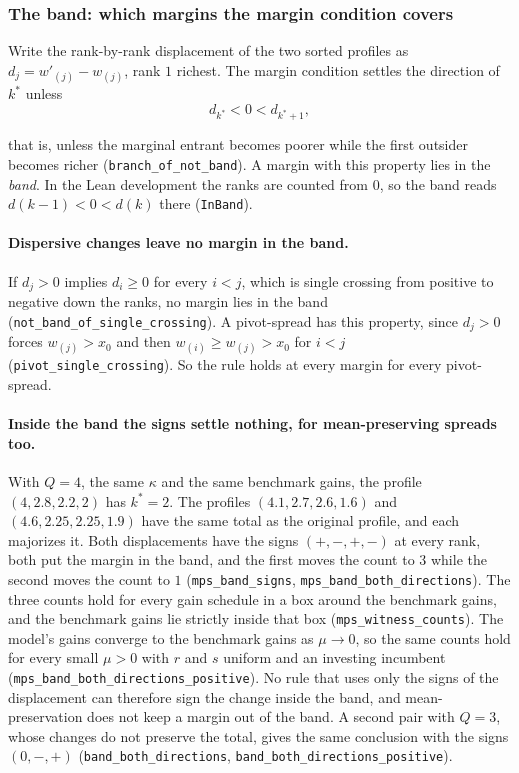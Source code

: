 \documentclass[11pt]{article}
\begin{document}
\subsubsection{The band: which margins the margin condition covers}
\label{prop:band}

Write the rank-by-rank displacement of the two sorted profiles as
$d_j=w'_{(j)}-w_{(j)}$, rank $1$ richest. The margin condition settles the
direction of $k^*$ unless
\[
  d_{k^*}<0<d_{k^*+1},
\]
\begin{sloppypar}\noindent
that is, unless the marginal entrant becomes poorer while the first outsider
becomes richer (\texttt{branch\_of\_not\_band}). A margin with this property
lies in the \emph{band}. In the Lean development the ranks are counted from
$0$, so the band reads $d(k-1)<0<d(k)$ there (\texttt{InBand}).
\end{sloppypar}

\begin{sloppypar}
\paragraph{Dispersive changes leave no margin in the band.} If $d_j>0$ implies
$d_i\ge0$ for every $i<j$, which is single crossing from positive to negative
down the ranks, no margin lies in the band
(\texttt{not\_band\_of\_single\_crossing}). A pivot-spread has this property,
since $d_j>0$ forces $w_{(j)}>x_0$ and then $w_{(i)}\ge w_{(j)}>x_0$ for $i<j$
(\texttt{pivot\_single\_crossing}). So the rule holds at every margin for every
pivot-spread.
\end{sloppypar}

\paragraph{Inside the band the signs settle nothing, for mean-preserving
spreads too.} With $Q=4$, the same $\kappa$ and the same benchmark gains, the
profile $(4,2.8,2.2,2)$ has $k^*=2$. The profiles $(4.1,2.7,2.6,1.6)$ and
$(4.6,2.25,2.25,1.9)$ have the same total as the original profile, and each
majorizes it. Both displacements have the signs $(+,-,+,-)$ at every rank, both
put the margin in the band, and the first moves the count to $3$ while the
second moves the count to $1$ (\texttt{mps\_band\_signs},
\texttt{mps\_band\_both\_directions}). The three counts hold for every gain
schedule in a box around the benchmark gains, and the benchmark gains lie
strictly inside that box (\texttt{mps\_witness\_counts}). The model's gains
converge to the benchmark gains as $\mu\to0$, so the same counts hold for every
small $\mu>0$ with $r$ and $s$ uniform and an investing incumbent
(\texttt{mps\_band\_both\_directions\_positive}). No rule that uses only the
signs of the displacement can therefore sign the change inside the band, and
mean-preservation does not keep a margin out of the band. A second pair with
$Q=3$, whose changes do not preserve the total, gives the same conclusion with
the signs $(0,-,+)$ (\texttt{band\_both\_directions},
\texttt{band\_both\_directions\_positive}).
\end{document}
